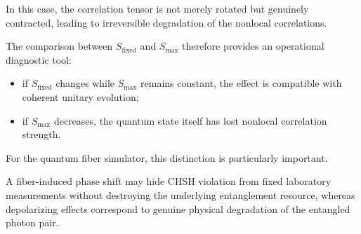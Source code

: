 In this case, the correlation tensor is not merely rotated but genuinely contracted, leading to irreversible degradation of the nonlocal correlations.

The comparison between \(S_{\mathrm{fixed}}\) and \(S_{\max}\) therefore provides an operational diagnostic tool:

\begin{itemize}
    \item if \(S_{\mathrm{fixed}}\) changes while \(S_{\max}\) remains constant, the effect is compatible with coherent unitary evolution;
    \item if \(S_{\max}\) decreases, the quantum state itself has lost nonlocal correlation strength.
\end{itemize}

For the quantum fiber simulator, this distinction is particularly important.

A fiber-induced phase shift may hide CHSH violation from fixed laboratory measurements without destroying the underlying entanglement resource, whereas depolarizing effects correspond to genuine physical degradation of the entangled photon pair.